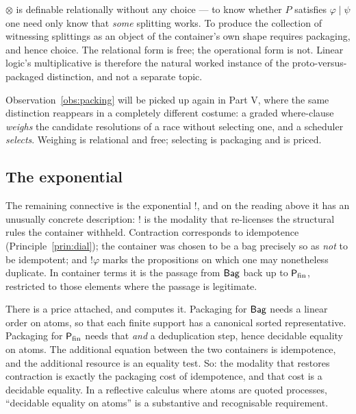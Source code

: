 \begin{observation}
\label{obs:packing}
$\otimes$ is definable relationally without any choice --- to know whether $P$
satisfies $\varphi \mid \psi$ one need only know that \emph{some} splitting works.
To produce the collection of witnessing splittings as an object of the container's
own shape requires packaging, and hence choice. The relational form is free; the
operational form is not. Linear logic's multiplicative is therefore the natural
worked instance of the proto-versus-packaged distinction, and not a separate
topic.
\end{observation}

Observation~\ref{obs:packing} will be picked up again in Part V, where the same
distinction reappears in a completely different costume: a graded where-clause
\emph{weighs} the candidate resolutions of a race without selecting one, and a
scheduler \emph{selects}. Weighing is relational and free; selecting is packaging
and is priced.

\subsection{The exponential}

The remaining connective is the exponential $!$, and on the reading above it has
an unusually concrete description: $!$ is the modality that re-licenses the
structural rules the container withheld. Contraction corresponds to idempotence
(Principle~\ref{prin:dial}); the container was chosen to be a bag precisely so as
\emph{not} to be idempotent; and $!\varphi$ marks the propositions on which one
may nonetheless duplicate. In container terms it is the passage from $\mathsf{Bag}$ back
up to $\mathsf{P}_{\mathrm{fin}}$, restricted to those elements where the passage is legitimate.

\begin{remark}
\label{rem:bangcost}
There is a price attached, and \cite{Zeus} computes it. Packaging for $\mathsf{Bag}$
needs a linear order on atoms, so that each finite support has a canonical sorted
representative. Packaging for $\mathsf{P}_{\mathrm{fin}}$ needs that \emph{and} a deduplication step,
hence decidable equality on atoms. The additional equation between the two
containers is idempotence, and the additional resource is an equality test. So:
the modality that restores contraction is exactly the packaging cost of
idempotence, and that cost is a decidable equality. In a reflective calculus where
atoms are quoted processes, ``decidable equality on atoms'' is a substantive and
recognisable requirement.
\end{remark}

